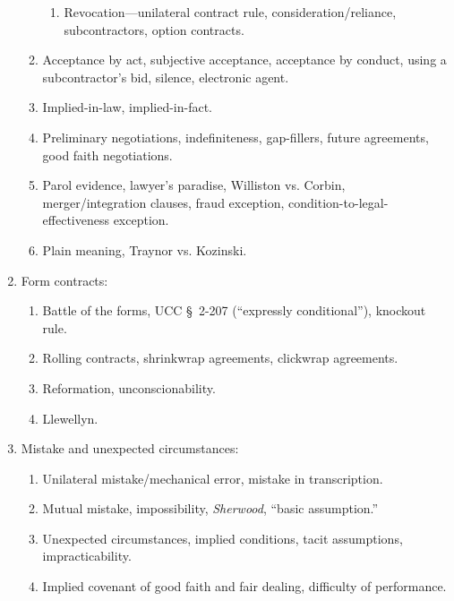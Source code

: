 \begin{enumerate}
\begin{enumerate}
\begin{enumerate}
            \item Revocation---unilateral contract rule, 
            consideration/reliance, subcontractors, option contracts.
        \end{enumerate}
        \item Acceptance by act, subjective acceptance, acceptance by conduct, 
        using a subcontractor's bid, silence, electronic agent.
        \item Implied-in-law, implied-in-fact.
        \item Preliminary negotiations, indefiniteness, gap-fillers, future 
        agreements, good faith negotiations.
        \item Parol evidence, lawyer's paradise, Williston vs. Corbin, 
        merger/integration clauses, fraud exception, 
        condition-to-legal-effectiveness exception.
        \item Plain meaning, Traynor vs. Kozinski.
    \end{enumerate}
    \item Form contracts:
    \begin{enumerate}
        \item Battle of the forms, UCC \S\ 2-207 (``expressly conditional''), 
        knockout rule.
        \item Rolling contracts, shrinkwrap agreements, clickwrap agreements.
        \item Reformation, unconscionability.
        \item Llewellyn.
    \end{enumerate}
    \item Mistake and unexpected circumstances:
    \begin{enumerate}
        \item Unilateral mistake/mechanical error, mistake in transcription.
        \item Mutual mistake, impossibility, \emph{Sherwood}, ``basic 
        assumption.''
        \item Unexpected circumstances, implied conditions, tacit assumptions, 
        impracticability.
        \item Implied covenant of good faith and fair dealing, difficulty of 
        performance.
    \end{enumerate}
\end{enumerate}
